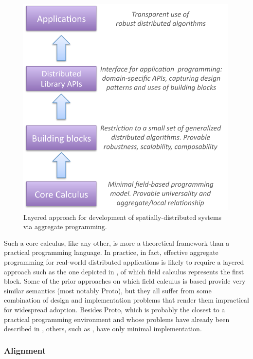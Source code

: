 \documentclass[12pt,a4paper,twoside,openright]{book}
\begin{document}
\begin{figure}
\centering
\includegraphics[width=0.99\textwidth]{img/aggregate-tower}
\caption{Layered approach for development of spatially-distributed systems via aggregate programming.}
\label{img:researchprogram}
\end{figure}

Such a core calculus, like any other, is more a theoretical framework than a practical programming language.
%
In practice, in fact, effective aggregate programming for real-world distributed applications is likely to require a layered approach such as the one depicted in , of which field calculus represents the first block.
%
Some of the prior approaches on which field calculus is based provide very similar semantics (most notably Proto), but they all suffer from some combination of design and implementation problems that render them impractical for widespread adoption.
%
Besides Proto, which is probably the closest to a practical programming environment and whose problems have already been described in , others, such as \cite{VPB-COORD2012}, have only minimal implementation.

\subsubsection{Alignment}
\end{document}
